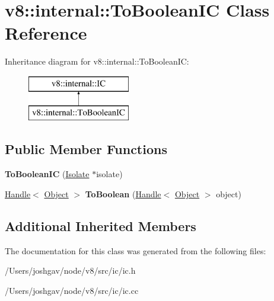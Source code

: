 \hypertarget{classv8_1_1internal_1_1_to_boolean_i_c}{}\section{v8\+:\+:internal\+:\+:To\+Boolean\+IC Class Reference}
\label{classv8_1_1internal_1_1_to_boolean_i_c}
Inheritance diagram for v8\+:\+:internal\+:\+:To\+Boolean\+IC\+:\begin{figure}[H]
\begin{center}
\leavevmode
\includegraphics[height=2.000000cm]{classv8_1_1internal_1_1_to_boolean_i_c}
\end{center}
\end{figure}
\subsection*{Public Member Functions}
\begin{DoxyCompactItemize}
\item 
{\bfseries To\+Boolean\+IC} (\hyperlink{classv8_1_1internal_1_1_isolate}{Isolate} $\ast$isolate)\hypertarget{classv8_1_1internal_1_1_to_boolean_i_c_a3cf1613dc23aa40758de8f5431e519a6}{}\label{classv8_1_1internal_1_1_to_boolean_i_c_a3cf1613dc23aa40758de8f5431e519a6}

\item 
\hyperlink{classv8_1_1internal_1_1_handle}{Handle}$<$ \hyperlink{classv8_1_1internal_1_1_object}{Object} $>$ {\bfseries To\+Boolean} (\hyperlink{classv8_1_1internal_1_1_handle}{Handle}$<$ \hyperlink{classv8_1_1internal_1_1_object}{Object} $>$ object)\hypertarget{classv8_1_1internal_1_1_to_boolean_i_c_a8dc50fab23d6720e8da58421a9280c5e}{}\label{classv8_1_1internal_1_1_to_boolean_i_c_a8dc50fab23d6720e8da58421a9280c5e}

\end{DoxyCompactItemize}
\subsection*{Additional Inherited Members}


The documentation for this class was generated from the following files\+:\begin{DoxyCompactItemize}
\item 
/\+Users/joshgav/node/v8/src/ic/ic.\+h\item 
/\+Users/joshgav/node/v8/src/ic/ic.\+cc\end{DoxyCompactItemize}
